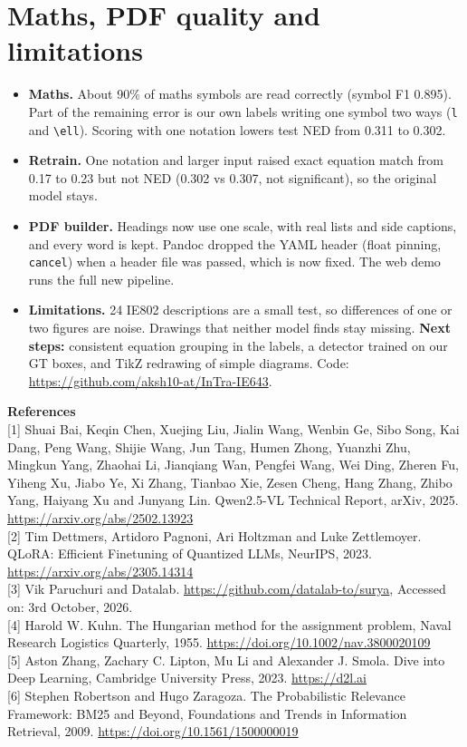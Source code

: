 \documentclass[11pt,a4paper]{article}
\begin{document}
\section{Maths, PDF quality and limitations}
\begin{itemize}
\item \textbf{Maths.} About 90\% of maths symbols are read correctly (symbol F1 0.895). Part of the remaining
error is our own labels writing one symbol two ways (\texttt{l} and \texttt{\textbackslash ell}). Scoring with
one notation lowers test NED from 0.311 to 0.302.
\item \textbf{Retrain.} One notation and larger input raised exact equation match from 0.17 to 0.23 but not
NED (0.302 vs 0.307, not significant), so the original model stays.
\item \textbf{PDF builder.} Headings now use one scale, with real lists and side captions, and every word is
kept. Pandoc dropped the YAML header (float pinning, \texttt{cancel}) when a header file was passed, which is
now fixed. The web demo runs the full new pipeline.
\item \textbf{Limitations.} 24 IE802 descriptions are a small test, so differences of one or two figures are
noise. Drawings that neither model finds stay missing. \textbf{Next steps:} consistent equation grouping in the labels, a detector trained on our GT boxes,
and TikZ redrawing of simple diagrams. Code: \url{https://github.com/aksh10-at/InTra-IE643}.
\end{itemize}

\vspace{2pt}
{\footnotesize\setlength{\parskip}{1pt}
\textbf{References}\\
{[1]} Shuai Bai, Keqin Chen, Xuejing Liu, Jialin Wang, Wenbin Ge, Sibo Song, Kai Dang, Peng Wang, Shijie Wang,
Jun Tang, Humen Zhong, Yuanzhi Zhu, Mingkun Yang, Zhaohai Li, Jianqiang Wan, Pengfei Wang, Wei Ding, Zheren Fu,
Yiheng Xu, Jiabo Ye, Xi Zhang, Tianbao Xie, Zesen Cheng, Hang Zhang, Zhibo Yang, Haiyang Xu and Junyang Lin.
Qwen2.5-VL Technical Report, arXiv, 2025. \url{https://arxiv.org/abs/2502.13923}\\
{[2]} Tim Dettmers, Artidoro Pagnoni, Ari Holtzman and Luke Zettlemoyer. QLoRA: Efficient Finetuning of
Quantized LLMs, NeurIPS, 2023. \url{https://arxiv.org/abs/2305.14314}\\
{[3]} Vik Paruchuri and Datalab. \url{https://github.com/datalab-to/surya}, Accessed on: 3rd October, 2026.\\
{[4]} Harold W. Kuhn. The Hungarian method for the assignment problem, Naval Research Logistics Quarterly, 1955.
\url{https://doi.org/10.1002/nav.3800020109}\\
{[5]} Aston Zhang, Zachary C. Lipton, Mu Li and Alexander J. Smola. Dive into Deep Learning, Cambridge
University Press, 2023. \url{https://d2l.ai}\\
{[6]} Stephen Robertson and Hugo Zaragoza. The Probabilistic Relevance Framework: BM25 and Beyond, Foundations
and Trends in Information Retrieval, 2009. \url{https://doi.org/10.1561/1500000019}
\par}
\end{document}
